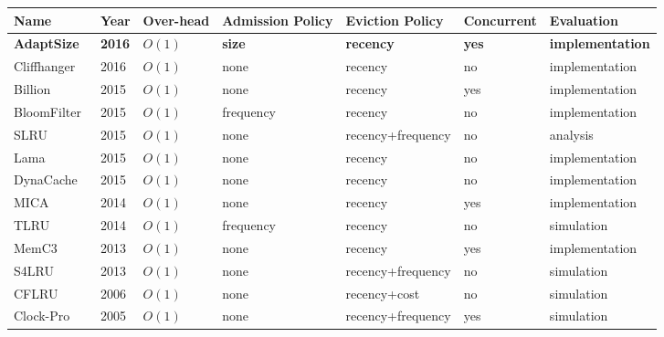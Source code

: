 \documentclass{article}
\begin{document}
\begin{table*}[!ht]
  \centering
  \def\arraystretch{1.25}
\footnotesize
\hspace{0mm}
  \begin{tabular}{| p{2.3cm}p{0.6cm}p{1cm}p{1.6cm}p{3.6cm}p{1.2cm}p{2.3cm}|}
\hline
   \rule{0pt}{8pt} Name & Year & Over-head & Admission Policy & Eviction Policy & \hspace{-2mm}Concurrent & Evaluation \\[1.3ex]
\hline
    \rule{0pt}{3pt}\cellcolor[HTML]{C0C0C0}\textbf{AdaptSize} & \cellcolor[HTML]{C0C0C0}\textbf{2016} & \cellcolor[HTML]{C0C0C0}\textbf{$O(1)$} & \cellcolor[HTML]{C0C0C0}\textbf{size} & \cellcolor[HTML]{C0C0C0}\textbf{recency} & \cellcolor[HTML]{C0C0C0}\textbf{yes} & \cellcolor[HTML]{C0C0C0}\textbf{implementation} \\[0.1ex]
    Cliffhanger~\cite{cidon2016cliffhanger} & 2016 &  $O(1)$ & none & recency & no & implementation \\
    Billion~\cite{li2015architecting} & 2015 &  $O(1)$ & none & recency & yes & implementation \\
    BloomFilter~\cite{maggs2015algorithmic} & 2015 &  $O(1)$ & frequency & recency & no & implementation \\
    SLRU~\cite{gast2015transient} & 2015 &  $O(1)$ & none & recency+frequency & no & analysis \\
    Lama~\cite{hu2015lama} & 2015 &  $O(1)$ & none & recency & no & implementation \\
    DynaCache~\cite{cidon2015dynacache} & 2015 &  $O(1)$ & none & recency & no & implementation \\
    MICA~\cite{lim2014mica} & 2014 &  $O(1)$ & none & recency & yes & implementation \\
    TLRU~\cite{einziger2014tinylfu} & 2014 &  $O(1)$ & frequency & recency & no & simulation \\
    MemC3~\cite{fan2013memc3} & 2013 &  $O(1)$ & none & recency & yes & implementation \\
    S4LRU~\cite{huang2013analysis} & 2013 &  $O(1)$ & none & recency+frequency & no & simulation \\
    CFLRU~\cite{park2006cflru} & 2006 &  $O(1)$ & none & recency+cost & no & simulation \\
    \mbox{Clock-Pro~\cite{jiang2005clock}} & 2005 &  $O(1)$ & none & recency+frequency & yes & simulation \\

\end{tabular}
\end{table*}
\end{document}
